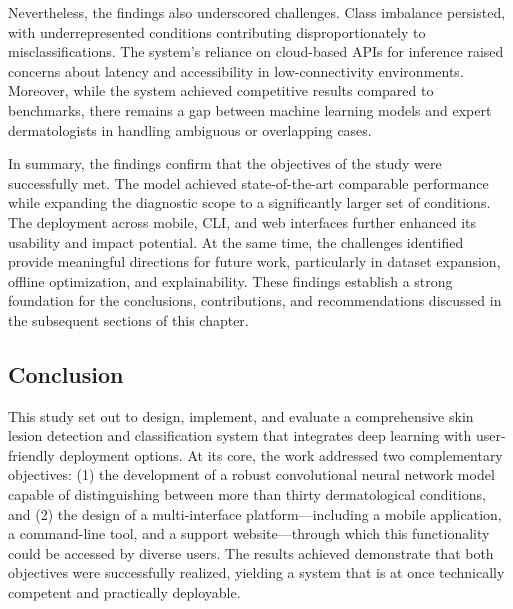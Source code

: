 \documentclass[
  12pt,
  oneside]{article}
\begin{document}
Nevertheless, the findings also underscored challenges. Class imbalance
persisted, with underrepresented conditions contributing
disproportionately to misclassifications. The system's reliance on
cloud-based APIs for inference raised concerns about latency and
accessibility in low-connectivity environments. Moreover, while the
system achieved competitive results compared to benchmarks, there
remains a gap between machine learning models and expert dermatologists
in handling ambiguous or overlapping cases.

In summary, the findings confirm that the objectives of the study were
successfully met. The model achieved state-of-the-art comparable
performance while expanding the diagnostic scope to a significantly
larger set of conditions. The deployment across mobile, CLI, and web
interfaces further enhanced its usability and impact potential. At the
same time, the challenges identified provide meaningful directions for
future work, particularly in dataset expansion, offline optimization,
and explainability. These findings establish a strong foundation for the
conclusions, contributions, and recommendations discussed in the
subsequent sections of this chapter.

\subsection{Conclusion}\label{conclusion-4}

This study set out to design, implement, and evaluate a comprehensive
skin lesion detection and classification system that integrates deep
learning with user-friendly deployment options. At its core, the work
addressed two complementary objectives: (1) the development of a robust
convolutional neural network model capable of distinguishing between
more than thirty dermatological conditions, and (2) the design of a
multi-interface platform---including a mobile application, a
command-line tool, and a support website---through which this
functionality could be accessed by diverse users. The results achieved
demonstrate that both objectives were successfully realized, yielding a
system that is at once technically competent and practically deployable.
\end{document}
